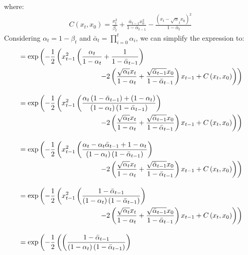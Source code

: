\documentclass[twoside]{article}
\numberwithin{equation}{section}
\numberwithin{figure}{section}
\begin{document}
where:
\begin{gather}
  C\left(x_t, x_0\right) = \frac{x_t^2}{\beta_t} + \frac{\bar{\alpha}_{t-1} x_0^2}{1 - \bar{\alpha}_{t-1}} - \frac{\left(x_t - \sqrt{\alpha}_t x_0\right)^2}{1 - \bar{\alpha}_{t}}
\end{gather}
Considering $\alpha_t = 1 - \beta_t$ and $\bar{\alpha}_t = \prod_{i=0}^{t}{\alpha_i}$, we can simplify the expression to:
\begin{align}
  &= \exp\left(- \frac{1}{2} \left(x_{t-1}^2 \left(\frac{\alpha_t}{1 - \alpha_t} + \frac{1}{1 - \bar{\alpha}_{t-1}}\right) \right. \right. \\
  &\hspace{4cm} \left. \left. - 2\left(\frac{\sqrt{\alpha_t} x_t}{1 - \alpha_t} + \frac{\sqrt{\bar{\alpha}_{t-1}} x_0}{1 - \bar{\alpha}_{t-1}}\right) x_{t-1} + C\left(x_t, x_0\right) \right) \right) \notag \\[10pt]
  &= \exp\left(- \frac{1}{2} \left(x_{t-1}^2 \left(\frac{\alpha_t \left(1 - \bar{\alpha}_{t-1}\right) + \left(1 - \alpha_t\right)}{\left(1 - \alpha_t\right)\left(1 - \bar{\alpha}_{t-1}\right)}\right) \right. \right. \\
  &\hspace{4cm} \left. \left. - 2\left(\frac{\sqrt{\alpha_t} x_t}{1 - \alpha_t} + \frac{\sqrt{\bar{\alpha}_{t-1}} x_0}{1 - \bar{\alpha}_{t-1}}\right) x_{t-1} + C\left(x_t, x_0\right) \right) \right) \notag \\[10pt]
  &= \exp\left(- \frac{1}{2} \left(x_{t-1}^2 \left(\frac{\alpha_t - \alpha_t \bar{\alpha}_{t-1} + 1 - \alpha_t}{\left(1 - \alpha_t\right)\left(1 - \bar{\alpha}_{t-1}\right)}\right) \right. \right. \\
  &\hspace{4cm} \left. \left. - 2\left(\frac{\sqrt{\alpha_t} x_t}{1 - \alpha_t} + \frac{\sqrt{\bar{\alpha}_{t-1}} x_0}{1 - \bar{\alpha}_{t-1}}\right) x_{t-1} + C\left(x_t, x_0\right) \right) \right) \notag \\[10pt]
  &= \exp\left(- \frac{1}{2} \left(x_{t-1}^2 \left(\frac{1 - \bar{\alpha}_{t-1}}{\left(1 - \alpha_t\right)\left(1 - \bar{\alpha}_{t-1}\right)}\right) \right. \right. \\
  &\hspace{4cm} \left. \left. - 2\left(\frac{\sqrt{\alpha_t} x_t}{1 - \alpha_t} + \frac{\sqrt{\bar{\alpha}_{t-1}} x_0}{1 - \bar{\alpha}_{t-1}}\right) x_{t-1} + C\left(x_t, x_0\right) \right) \right) \notag \\[10pt]
  &= \exp\left(- \frac{1}{2} \left( \left(\frac{1 - \bar{\alpha}_{t-1}}{\left(1 - \alpha_t\right)\left(1 - \bar{\alpha}_{t-1}\right)}\right)  \right. \right. \\

\end{align}
\end{document}
